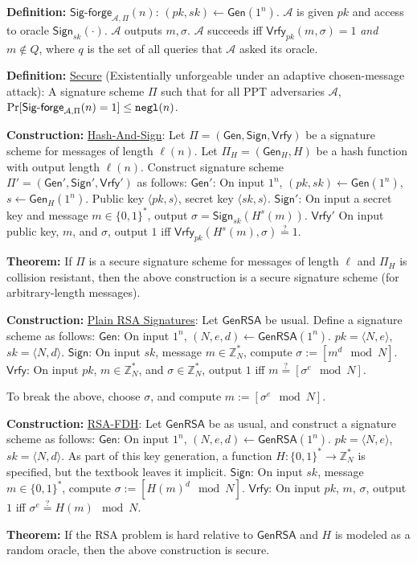 \documentclass[10pt]{article}
\newcommand{\Z}{\mathbb{Z}}
\newcommand{\AAA}{\mathcal{A}}
\newcommand{\defn}[1]{{\bf Definition:} \underline{#1}}
\newcommand{\thm}[1]{{\bf Theorem:} \underline{#1}}
\newcommand{\con}[1]{{\bf Construction:} \underline{#1}}
\newcommand{\Sign}{\mathsf{Sign}}
\newcommand{\Vrfy}{\mathsf{Vrfy}}
\newcommand{\Gen}{\mathsf{Gen}}
\newcommand{\GenRSA}{\mathsf{GenRSA}}
\newcommand{\ang}[1]{\langle#1\rangle}
\newcommand{\ExptSigF}{\mathsf{Sig\text{-}forge}_{\AAA,\Pi}}
\newcommand{\negl}{{\tt negl}}
\newcommand{\from}{\leftarrow}
\begin{document}
\begin{multicols}{3}
\defn{$\ExptSigF(n)$}: $(pk,sk)\from\Gen(1^n)$. $\AAA$ is given $pk$ and access to oracle $\Sign_{sk}(\cdot)$. $\AAA$ outputs $m,\sigma$. $\AAA$ succeeds iff $\Vrfy_{pk}(m,\sigma)=1$ {\it and} $m\not\in Q$, where $q$ is the set of all queries that $\AAA$ asked its oracle.

\defn{Secure} (Existentially unforgeable under an adaptive chosen-message attack): A signature scheme $\Pi$ such that for all PPT adversaries $\AAA$, $\Pr[\ExptSigF(n)=1]\leq\negl(n)$.

\con{Hash-And-Sign}: Let $\Pi=(\Gen,\Sign,\Vrfy)$ be a signature scheme for messages of length $\ell(n)$. Let $\Pi_{H}=(\Gen_H,H)$ be a hash function with output length $\ell(n)$. Construct signature scheme $\Pi'=(\Gen',\Sign',\Vrfy')$ as follows: $\Gen'$: On input $1^n$, $(pk,sk)\from\Gen(1^n)$, $s\from\Gen_H(1^n)$. Public key $\ang{pk,s}$, secret key $\ang{sk,s}$. $\Sign'$: On input a secret key and message $m\in\{0,1\}^*$, output $\sigma=\Sign_{sk}(H^s(m))$. $\Vrfy'$ On input public key, $m$, and $\sigma$, output $1$ iff $\Vrfy_{pk}(H^s(m),\sigma)\overset{?}{=}1$.

\thm{}If $\Pi$ is a secure signature scheme for messages of length $\ell$ and $\Pi_H$ is collision resistant, then the above construction is a secure signature scheme (for arbitrary-length messages).

\con{Plain RSA Signatures}: Let $\GenRSA$ be usual. Define a signature scheme as follows: $\Gen$: On input $1^n$, $(N,e,d)\from\GenRSA(1^n)$. $pk=\ang{N,e}$, $sk=\ang{N,d}$. $\Sign$: On input $sk$, message $m\in\Z_N^*$, compute $\sigma:=[m^d\mod{N}]$. $\Vrfy$: On input $pk$, $m\in\Z_N^*$, and $\sigma\in\Z_N^*$, output $1$ iff $m\overset{?}{=}[\sigma^e\mod{N}]$.

To break the above, choose $\sigma$, and compute $m:=[\sigma^e\mod{N}]$.

\con{RSA-FDH}: Let $\GenRSA$ be as usual, and construct a signature scheme as follows: $\Gen$: On input $1^n$, $(N,e,d)\from\GenRSA(1^n)$. $pk=\ang{N,e}$, $sk=\ang{N,d}$. As part of this key generation, a function $H:\{0,1\}^*\to\Z_N^*$ is specified, but the textbook leaves it implicit. $\Sign$: On input $sk$, message $m\in\{0,1\}^*$, compute $\sigma:=[H(m)^d\mod{N}]$. $\Vrfy$: On input $pk$, $m$, $\sigma$, output $1$ iff $\sigma^e\overset{?}{=}H(m)\mod{N}$.

\thm{} If the RSA problem is hard relative to $\GenRSA$ and $H$ is modeled as a random oracle, then the above construction is secure.

\end{multicols}
\end{document}
